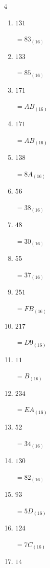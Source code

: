 \begin{multicols}{4}
\begin{enumerate}
  \item $131$

        $=83_{(16)}$

  \item $133$

        $=85_{(16)}$

  \item $171$

        $=AB_{(16)}$

  \item $171$

        $=AB_{(16)}$

  \item $138$

        $=8A_{(16)}$

  \item $56$

        $=38_{(16)}$

  \item $48$

        $=30_{(16)}$

  \item $55$

        $=37_{(16)}$

  \item $251$

        $=FB_{(16)}$

  \item $217$

        $=D9_{(16)}$

  \item $11$

        $=B_{(16)}$

  \item $234$

        $=EA_{(16)}$

\columnbreak %

  \item $52$

        $=34_{(16)}$

  \item $130$

        $=82_{(16)}$

  \item $93$

        $=5D_{(16)}$

  \item $124$

        $=7C_{(16)}$

  \item $14$


\end{enumerate}
\end{multicols}
